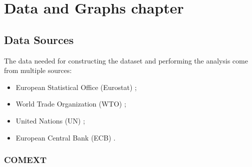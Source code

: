 \chapter{Data and Graphs chapter}

\section{Data Sources}

The data needed for constructing the dataset and performing the analysis come from multiple sources:
\begin{itemize}
    \item European Statistical Office (Eurostat) \cite{eurostat2022comext};
    \item World Trade Organization (WTO) \cite{wto2022stats};
    \item United Nations (UN) \cite{un2022population};
    \item European Central Bank (ECB) \cite{ecb2021usdeur}.
\end{itemize}

\subsection{COMEXT}

